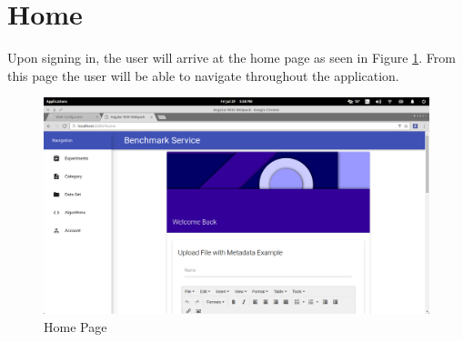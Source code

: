 \documentclass[11pt,a4paper]{article}
\begin{document}
\section{Home}
Upon signing in, the user will arrive at the home page as seen in Figure \ref{fig:homePage}. From this page the user will be able 
to navigate throughout the application.
\begin{figure}[H]
	\begin{center}
		\includegraphics[scale=0.6]{../Images/User Manual/Home Page.png}
		\caption{Home Page}
		\label{fig:homePage}
	\end{center}  
\end{figure}
\end{document}
